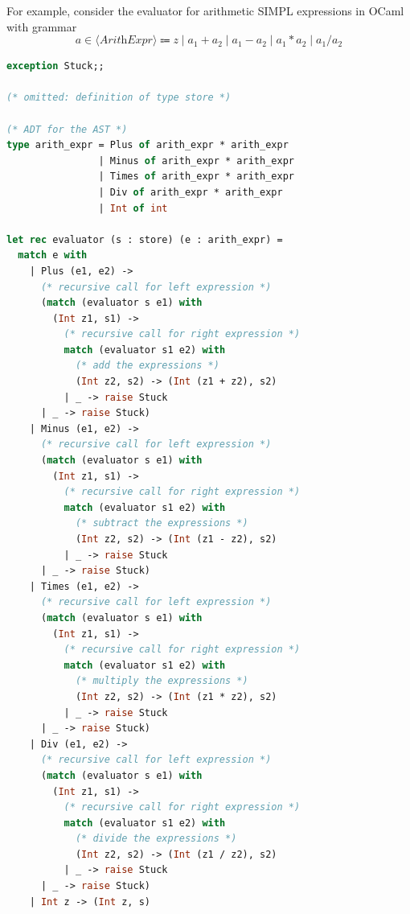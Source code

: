 For example, consider the evaluator for arithmetic SIMPL expressions in OCaml with grammar 
\[
  a \in \langle \textit{ArithExpr} \rangle \Coloneqq z \mid a_1 + a_2 \mid a_1 - a_2 \mid a_1 * a_2 \mid a_1 / a_2
\]
\begin{lstlisting}[language=OCaml]
exception Stuck;;

(* omitted: definition of type store *)

(* ADT for the AST *)
type arith_expr = Plus of arith_expr * arith_expr
                | Minus of arith_expr * arith_expr
                | Times of arith_expr * arith_expr
                | Div of arith_expr * arith_expr
                | Int of int

let rec evaluator (s : store) (e : arith_expr) = 
  match e with 
    | Plus (e1, e2) ->
      (* recursive call for left expression *)
      (match (evaluator s e1) with
        (Int z1, s1) ->
          (* recursive call for right expression *)
          match (evaluator s1 e2) with
            (* add the expressions *)
            (Int z2, s2) -> (Int (z1 + z2), s2)
          | _ -> raise Stuck
      | _ -> raise Stuck)
    | Minus (e1, e2) ->
      (* recursive call for left expression *)
      (match (evaluator s e1) with
        (Int z1, s1) ->
          (* recursive call for right expression *)
          match (evaluator s1 e2) with
            (* subtract the expressions *)
            (Int z2, s2) -> (Int (z1 - z2), s2)
          | _ -> raise Stuck
      | _ -> raise Stuck)
    | Times (e1, e2) ->
      (* recursive call for left expression *)
      (match (evaluator s e1) with
        (Int z1, s1) ->
          (* recursive call for right expression *)
          match (evaluator s1 e2) with
            (* multiply the expressions *)
            (Int z2, s2) -> (Int (z1 * z2), s2)
          | _ -> raise Stuck
      | _ -> raise Stuck)
    | Div (e1, e2) ->
      (* recursive call for left expression *)
      (match (evaluator s e1) with
        (Int z1, s1) ->
          (* recursive call for right expression *)
          match (evaluator s1 e2) with
            (* divide the expressions *)
            (Int z2, s2) -> (Int (z1 / z2), s2)
          | _ -> raise Stuck
      | _ -> raise Stuck)
    | Int z -> (Int z, s)
\end{lstlisting}

